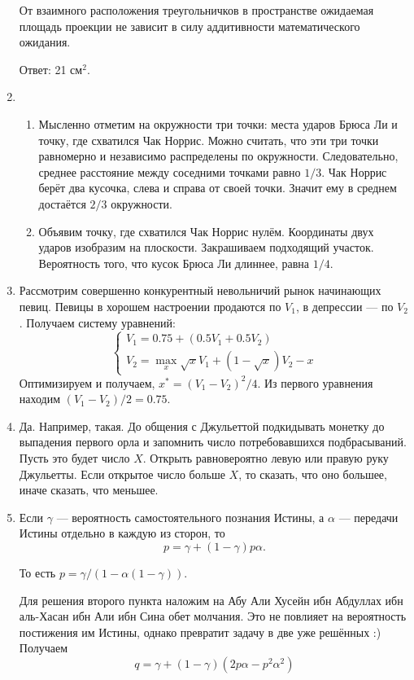 \begin{enumerate}
От взаимного расположения треугольничков в пространстве ожидаемая площадь проекции не зависит в силу аддитивности математического ожидания.

Ответ: 21 см$^2$.

\item
\begin{enumerate}
\item Мысленно отметим на окружности три точки: места ударов Брюса Ли и точку, где схватился Чак Норрис. Можно считать, что эти три точки равномерно и независимо распределены по окружности. Следовательно, среднее расстояние между соседними точками равно $1/3$. Чак Норрис берёт два кусочка, слева и справа от своей точки. Значит ему в среднем достаётся $2/3$ окружности.
\item Объявим точку, где схватился Чак Норрис нулём. Координаты двух ударов изобразим на плоскости. Закрашиваем подходящий участок. Вероятность того, что кусок Брюса Ли длиннее, равна $1/4$.
\end{enumerate}

\item  Рассмотрим совершенно конкурентный невольничий рынок начинающих певиц. Певицы в хорошем настроении продаются по $V_1$, в депрессии — по $V_2$. Получаем систему уравнений:
\[
\begin{cases}
  V_1 = 0.75 + (0.5 V_1 + 0.5 V_2) \\
  V_2 = \max_x \sqrt{x}V_1 + (1 - \sqrt{x})V_2 - x
\end{cases}
\]
Оптимизируем и получаем, $x^* = (V_1 - V_2)^2/4$. Из первого уравнения находим $(V_1 - V_2)/2=0.75$.

\item Да. Например, такая. До общения с Джульеттой подкидывать монетку до выпадения первого орла и запомнить число потребовавшихся подбрасываний. Пусть это будет число $X$. Открыть равновероятно левую или правую руку Джульетты. Если открытое число больше $X$, то сказать, что оно большее, иначе сказать, что меньшее.
\item Если $\gamma$ — вероятность самостоятельного познания Истины, а $\alpha$ — передачи Истины отдельно в каждую из сторон, то
\[
p = \gamma + (1-\gamma) p \alpha.
\]

То есть $p=\gamma/(1-\alpha(1-\gamma))$.

Для решения второго пункта наложим на Абу Али Хусейн ибн Абдуллах ибн аль-Хасан ибн Али ибн Сина обет молчания. Это не повлияет на вероятность постижения им Истины, однако превратит задачу в две уже решённых :) Получаем
\[
q = \gamma + (1-\gamma)(2p\alpha - p^2\alpha^2)
\]
\end{enumerate}


